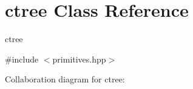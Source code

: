 \hypertarget{classctree}{}\section{ctree Class Reference}
\label{classctree}


ctree  




{\ttfamily \#include $<$primitives.\+hpp$>$}



Collaboration diagram for ctree\+:
